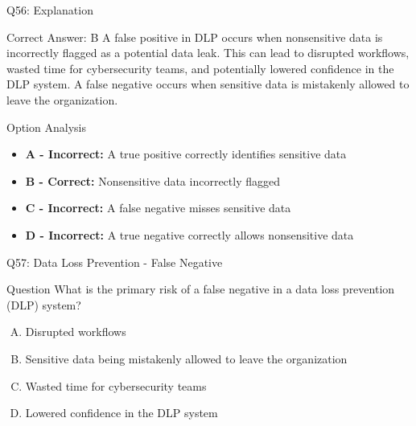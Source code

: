\documentclass{beamer}
\begin{document}
	\begin{frame}{Q56: Explanation}
		\begin{block}{Correct Answer: B}
			A false positive in DLP occurs when nonsensitive data is incorrectly flagged as a potential data leak. This can lead to disrupted workflows, wasted time for cybersecurity teams, and potentially lowered confidence in the DLP system. A false negative occurs when sensitive data is mistakenly allowed to leave the organization.
		\end{block}
		\begin{block}{Option Analysis}
			\begin{itemize}
				\item \textbf{A - Incorrect:} A true positive correctly identifies sensitive data
				\item \textbf{B - Correct:} Nonsensitive data incorrectly flagged
				\item \textbf{C - Incorrect:} A false negative misses sensitive data
				\item \textbf{D - Incorrect:} A true negative correctly allows nonsensitive data
			\end{itemize}
		\end{block}
	\end{frame}
	
	\begin{frame}{Q57: Data Loss Prevention - False Negative}
		\begin{block}{Question}
			What is the primary risk of a false negative in a data loss prevention (DLP) system?
		\end{block}
		\begin{enumerate}[(A)]
			\item Disrupted workflows
			\item Sensitive data being mistakenly allowed to leave the organization
			\item Wasted time for cybersecurity teams
			\item Lowered confidence in the DLP system
		\end{enumerate}
	\end{frame}
	
\end{document}
